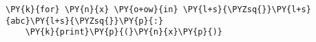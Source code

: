 \begin{Verbatim}[commandchars=\\\{\}]
\PY{k}{for} \PY{n}{x} \PY{o+ow}{in} \PY{l+s}{\PYZsq{}}\PY{l+s}{abc}\PY{l+s}{\PYZsq{}}\PY{p}{:}
    \PY{k}{print}\PY{p}{(}\PY{n}{x}\PY{p}{)}
\end{Verbatim}
